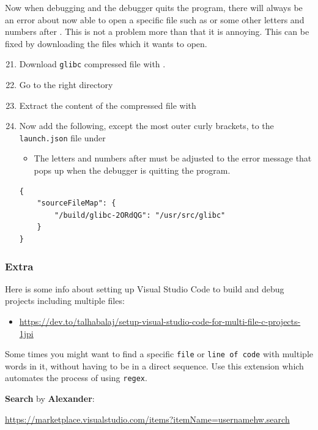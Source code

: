 \newpage
Now when debugging and the debugger quits the program, there will always be an error about now able to open a specific file such as  or some other letters and numbers after . This is not a problem more than that it is annoying. This can be fixed by downloading the files which it wants to open.

\begin{enumerate}
    \setcounter{enumi}{20}
    
    \item Download \texttt{glibc} compressed file with .
    
    \item Go to the right directory 
    
    \item Extract the content of the compressed file with 
    
    \item Now add the following, except the most outer curly brackets, to the \texttt{launch.json} file under\\
    \begin{itemize}
        \item The letters and numbers after  must be adjusted to the error message that pops up when the debugger is quitting the program.
    \end{itemize}
    
\begin{verbatim}
{
    "sourceFileMap": {
        "/build/glibc-2ORdQG": "/usr/src/glibc"
    }
}
\end{verbatim}

\end{enumerate}
\subsubsection{Extra}
Here is some info about setting up Visual Studio Code to build and debug projects including multiple  files:
\begin{itemize}
    \item \url{https://dev.to/talhabalaj/setup-visual-studio-code-for-multi-file-c-projects-1jpi}
\end{itemize}


Some times you might want to find a specific \texttt{file} or \texttt{line of code} with multiple words in it, without having to be in a direct sequence. Use this extension which automates the process of using \texttt{regex}.

\textbf{Search} by \textbf{Alexander}:

\url{https://marketplace.visualstudio.com/items?itemName=usernamehw.search}